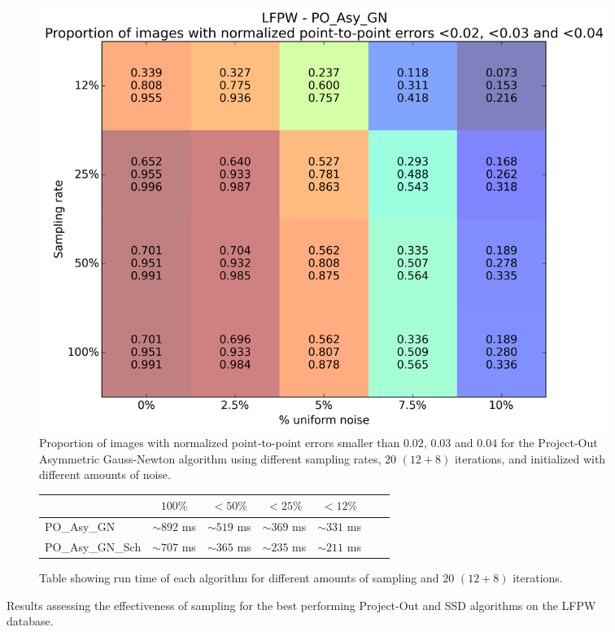 \begin{figure}[p]
\begin{subfigure}{0.48\textwidth}
	    \label{fig:sampling_vs_noise_ssd_asy_gn_20}
	\end{subfigure}
	\hfill
	\begin{subfigure}{0.48\textwidth}
	    \includegraphics[width=\textwidth]{experiments/sampling/sampling_vs_noise_po_asy_gn_20.png}
	    \caption{Proportion of images with normalized point-to-point errors smaller than $0.02$, $0.03$ and $0.04$ for the Project-Out Asymmetric Gauss-Newton algorithm using different sampling rates, $20$ $(12 + 8)$ iterations, and initialized with different amounts of noise.}
	    \label{fig:sampling_vs_noise_po_asy_gn_20}
	\end{subfigure}
	\par\bigskip\bigskip
	\begin{subfigure}{\textwidth}
		\center
		\begin{tabular}{lcccccc}
		    \toprule
		    & $100\%$ & $<50\%$ & $<25\%$ & $<12\%$ 
		    \\
		    \midrule
		    PO\_Asy\_GN & $\sim892$ ms & $\sim519$ ms & $\sim369$ ms & $\sim331$ ms
		    \\ 
		    PO\_Asy\_GN\_Sch & $\sim707$ ms & $\sim365$ ms & $\sim235$ ms & $\sim211$ ms
		    \\
		    \bottomrule
	  	\end{tabular}
	  	\caption{Table showing run time of each algorithm for different amounts of sampling and $20$ $(12 + 8)$ iterations.}
	    \label{tab:runtime_20}
	\end{subfigure}
	\caption{Results assessing the effectiveness of sampling for the best performing Project-Out and SSD algorithms on the LFPW database.}
	\label{fig:sampling}
\end{figure}


